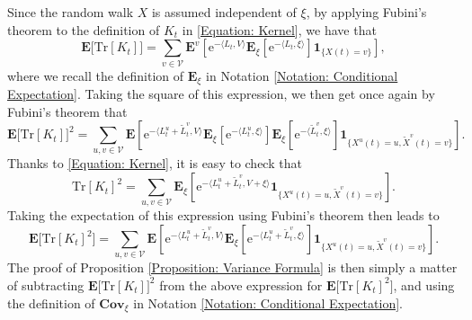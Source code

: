 \documentclass{amsart}
\numberwithin{equation}{section}
\theoremstyle{definition}
\newcommand\mbf{\mathbf}
\newcommand\mr{\mathrm}
\newcommand\ms{\mathscr}
\begin{document}
%

Since the random walk $X$ is assumed independent of $\xi$, by applying Fubini's theorem
to the definition of $K_t$ in \eqref{Equation: Kernel},
we have that
\[\mbf E\big[\mr{Tr}[K_t]\big]=\sum_{v\in\ms V}\mbf E^v\left[\mr e^{-\langle L_t,V\rangle}\mbf E_\xi\left[\mr e^{-\langle L_t,\xi\rangle}\right]\mbf 1_{\{X(t)=v\}}\right],\]
where we recall the definition of $\mbf E_\xi$ in Notation \ref{Notation: Conditional Expectation}.
Taking the square of this expression, we then get once again by Fubini's theorem that
\[\mbf E\big[\mr{Tr}[K_t]\big]^2=\sum_{u,v\in\ms V}\mbf E\left[\mr e^{-\langle L^u_t+\tilde L^v_t,V\rangle}
\mbf E_\xi\left[\mr e^{-\langle L^u_t,\xi\rangle}\right]\mbf E_\xi\left[\mr e^{-\langle\tilde L^v_t,\xi\rangle}\right]\mbf 1_{\{X^u(t)=u,\tilde X^v(t)=v\}}\right].\]
Thanks to \eqref{Equation: Kernel}, it is easy to check that
\[\mr{Tr}[K_t]^2=\sum_{u,v\in\ms V}\mbf E_{\xi}\left[\mr e^{-\langle L^u_t+\tilde L^v_t,V+\xi\rangle}\mbf 1_{\{X^u(t)=u,\tilde X^v(t)=v\}}\right].\]
Taking the expectation of this expression using Fubini's theorem then leads to
\[\mbf E\big[\mr{Tr}[K_t]^2\big]=\sum_{u,v\in\ms V}\mbf E\left[\mr e^{-\langle L^u_t+\tilde L^v_t,V\rangle}
\mbf E_\xi\left[\mr e^{-\langle L^u_t+\tilde L^v_t,\xi\rangle}\right]\mbf 1_{\{X^u(t)=u,\tilde X^v(t)=v\}}\right].\]
The proof of Proposition \ref{Proposition: Variance Formula} is then simply a matter of subtracting
$\mbf E\big[\mr{Tr}[K_t]\big]^2$ from the above expression for $\mbf E\big[\mr{Tr}[K_t]^2\big]$,
and using the definition of $\mbf{Cov}_\xi$ in Notation \ref{Notation: Conditional Expectation}.

%
\end{document}
